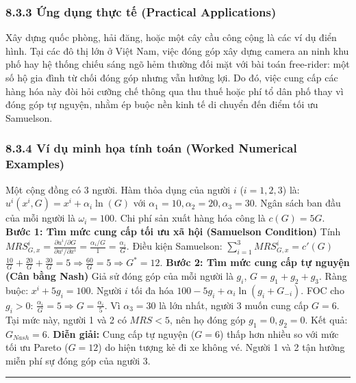 \documentclass[
]{article}
\begin{document}
\subsubsection{8.3.3 Ứng dụng thực tế (Practical
Applications)}\label{ux1ee9ng-dux1ee5ng-thux1ef1c-tux1ebf-practical-applications-28}

Xây dựng quốc phòng, hải đăng, hoặc một cây cầu công cộng là các ví dụ
điển hình. Tại các đô thị lớn ở Việt Nam, việc đóng góp xây dựng camera
an ninh khu phố hay hệ thống chiếu sáng ngõ hẻm thường đối mặt với bài
toán free-rider: một số hộ gia đình từ chối đóng góp nhưng vẫn hưởng
lợi. Do đó, việc cung cấp các hàng hóa này đòi hỏi cưỡng chế thông qua
thu thuế hoặc phí tổ dân phố thay vì đóng góp tự nguyện, nhằm ép buộc
nền kinh tế di chuyển đến điểm tối ưu Samuelson.

\subsubsection{8.3.4 Ví dụ minh họa tính toán (Worked Numerical
Examples)}\label{vuxed-dux1ee5-minh-hux1ecda-tuxednh-touxe1n-worked-numerical-examples-27}

Một cộng đồng có 3 người. Hàm thỏa dụng của người \(i\) (\(i=1,2,3\))
là: \(u^i(x^i, G) = x^i + \alpha_i \ln(G)\) với
\(\alpha_1 = 10, \alpha_2 = 20, \alpha_3 = 30\). Ngân sách ban đầu của
mỗi người là \(\omega_i = 100\). Chi phí sản xuất hàng hóa công là
\(c(G) = 5G\). \textbf{Bước 1: Tìm mức cung cấp tối ưu xã hội (Samuelson
Condition)} Tính
\(MRS^i_{G,x} = \frac{\partial u^i / \partial G}{\partial u^i / \partial x^i} = \frac{\alpha_i / G}{1} = \frac{\alpha_i}{G}\).
Điều kiện Samuelson: \(\sum_{i=1}^3 MRS^i_{G,x} = c'(G)\)
\(\frac{10}{G} + \frac{20}{G} + \frac{30}{G} = 5 \Rightarrow \frac{60}{G} = 5 \Rightarrow G^* = 12\).
\textbf{Bước 2: Tìm mức cung cấp tự nguyện (Cân bằng Nash)} Giả sử đóng
góp của mỗi người là \(g_i\), \(G = g_1 + g_2 + g_3\). Ràng buộc:
\(x^i + 5g_i = 100\). Người \(i\) tối đa hóa
\(100 - 5g_i + \alpha_i \ln(g_i + G_{-i})\). FOC cho \(g_i > 0\):
\(\frac{\alpha_i}{G} = 5 \Rightarrow G = \frac{\alpha_i}{5}\). Vì
\(\alpha_3 = 30\) là lớn nhất, người 3 muốn cung cấp \(G = 6\). Tại mức
này, người 1 và 2 có \(MRS < 5\), nên họ đóng góp \(g_1 = 0, g_2 = 0\).
Kết quả: \(G_{Nash} = 6\). \textbf{Diễn giải:} Cung cấp tự nguyện
(\(G=6\)) thấp hơn nhiều so với mức tối ưu Pareto (\(G=12\)) do hiện
tượng kẻ đi xe không vé. Người 1 và 2 tận hưởng miễn phí sự đóng góp của
người 3.

\begin{center}\rule{0.5\linewidth}{0.5pt}\end{center}
\end{document}
